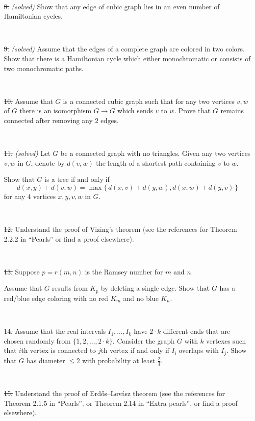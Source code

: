 \documentclass[oneside,a4paper]{article}
\begin{document}
\ 

\noindent %
\sout{8.} \textit{(solved)}
Show that any edge of cubic graph lies in an even number of Hamiltonian cycles.


\ 

\noindent 
\sout{9.} \textit{(solved)}
Assume that the edges of a complete graph are colored in two colors.
Show that there is a Hamiltonian cycle which either monochromatic or consists of two monochromatic paths.

\ 

\noindent %
\sout{10.}  %
Assume that $G$ is a connected cubic graph such that 
for any two vertices $v,w$ of $G$ there is an isomorphism
$G\to G$ which sends $v$ to $w$.
Prove that $G$ remains connected after removing any $2$ edges.

\ 


\noindent \sout{11.} \textit{(solved)}
Let $G$ be a connected graph with no triangles.
Given any two vertices $v,w$ in $G$, denote by $d(v,w)$ the length of a shortest path containing $v$ to $w$. 

Show that $G$ is a tree if and only if
\[d(x,y)+d(v,w)=\max\{\,d(x,v)+d(y,w),d(x,w)+d(y,v)\,\}\]
for any 4 vertices $x,y,v,w$ in $G$.

\ 

\noindent %
\sout{12.} %
Understand the proof of Vizing's theorem (see the references for Theorem 2.2.2 in ``Pearls'' or find a proof elsewhere).

\ 

\noindent %
\sout{13.} %
Suppose $p=r(m,n)$ is the Ramsey number for $m$ and $n$.%


Assume that $G$ results from $K_p$ by deleting a single edge.
Show that $G$ has a red/blue edge coloring with no red
$K_m$ and no blue $K_n$.


\ 

\noindent %
\sout{14.} %
Assume that the real intervals $I_1,\dots,I_k$ have $2{\cdot}k$ different ends that are chosen randomly from $\{1,2,\dots,2{\cdot} k\}$.
Consider the graph $G$ with $k$ vertexes such that $i$th vertex is connected to $j$th vertex if and only if $I_i$ overlaps with $I_j$.
Show that $G$ has diameter $\le 2$ with probability at least $\tfrac23$.

\ 

\noindent %
\sout{15.} 
Understand the proof of Erd\H{o}s--Lov\'{a}sz theorem (see the references for Theorem 2.1.5 in ``Pearls'', or Theorem 2.14 in ``Extra pearls'', or find a proof elsewhere).
\end{document}

